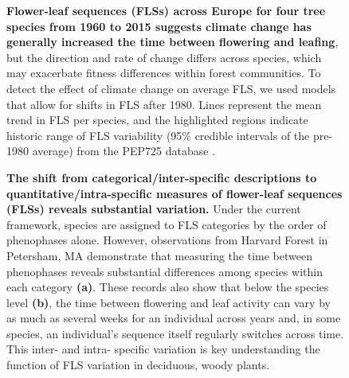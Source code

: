 \documentclass[12pt]{article}
\begin{document}
\begin{figure}[h!]
    \centering
    \caption{\textbf{Flower-leaf sequences (FLSs) across Europe for four tree species from 1960 to 2015 suggests climate change has generally increased the time between flowering and leafing}, but the direction and rate of change differs across species, which may exacerbate fitness differences within forest communities. To detect the effect of climate change on average FLS, we used models that allow for shifts in FLS after 1980. Lines represent the mean trend in FLS per species, and the highlighted regions indicate historic range of FLS variability (95\% credible intervals of the pre-1980 average) from the PEP725 database \citep{PEP725}.}
    \label{fig:climchange}
\end{figure}
 
 \begin{figure}[h!]
        \centering
          \caption{\textbf{The shift from categorical/inter-specific descriptions to quantitative/intra-specific measures of flower-leaf sequences (FLSs) reveals substantial variation.} Under the current framework, species are assigned to FLS categories by the order of phenophases alone. However, observations from Harvard Forest in Petersham, MA demonstrate that measuring the time between phenophases reveals substantial differences among species within each category \textbf{(a)}. These records also show that below the species level \textbf{(b)}, the time between flowering and leaf activity can vary by as much as several weeks for an individual across years and, in some species, an individual's sequence itself regularly switches across time. This inter- and intra- specific variation is key understanding the function of FLS variation in deciduous, woody plants.}
        \label{fig:vizzy}
    \end{figure}

\pagebreak  
\end{document}
